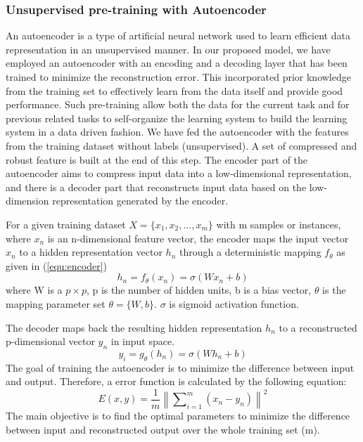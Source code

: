 \documentclass[letterpaper, 10pt, conference]{ieeeconf} %
\newcommand{\equ}[1]{(\ref{#1})}
\newcommand\norm[1]{\left\lVert#1\right\rVert}
\begin{document}
   
\subsubsection{ Unsupervised pre-training with Autoencoder}
An autoencoder is a type of artificial neural network used to learn efficient data representation in an unsupervised manner. In our proposed model, we have employed an autoencoder with an encoding and a decoding layer  that has been trained to minimize the reconstruction error. This incorporated prior knowledge from the training set to effectively learn from the data itself and provide good performance. Such pre-training allow both the data for the current task and for previous related tasks to self-organize the learning system to build the learning system in a data driven fashion. We have fed the autoencoder with the features from the training dataset without labels (unsupervised). A set of compressed and robust feature is built at the end of this step. The encoder part of the autoencoder aims to compress input data into a low-dimensional
representation, and there is a decoder part that reconstructs input data based on the low-dimension representation generated by the encoder.

For a given training dataset $X = \{x_1, x_2, ..., x_m\}$ with
m samples or instances, where $x_n$ is an n-dimensional feature vector, the
encoder maps the input vector $x_n$ to a hidden representation
vector $h_n$ through a deterministic mapping $f_{\theta}$ as given in \equ{equ:encoder}
\begin{equation}
\label{equ:encoder}
h_n = f_{\theta}(x_n) = \sigma(W x_{n} + b)
\end{equation}
where W is a $p \times p$, p is the number of hidden units, b is a bias vector, $\theta$ is the mapping parameter set $\theta = \{W, b\}$. $\sigma$ is sigmoid activation function.

The decoder maps back the resulting hidden representation
$h_n$ to a reconstructed p-dimensional vector $y_n$ in input space.
\begin{equation}
\label{equ:encoder}
y_i = g_{\theta}(h_n) = \sigma(W h_{n} + b)
\end{equation}
The goal of training the autoencoder is to minimize the
difference between input and output. Therefore, a error function
is calculated by the following equation:
\begin{equation} E(x,y)= {\frac{1}{m}}\norm{\sum\nolimits_{i=1}^{m}(x_{n}-y_{n})}^{2} \end{equation}
The main objective is to find the optimal parameters to minimize the difference between input and reconstructed output over the whole training set (m).
\end{document}
